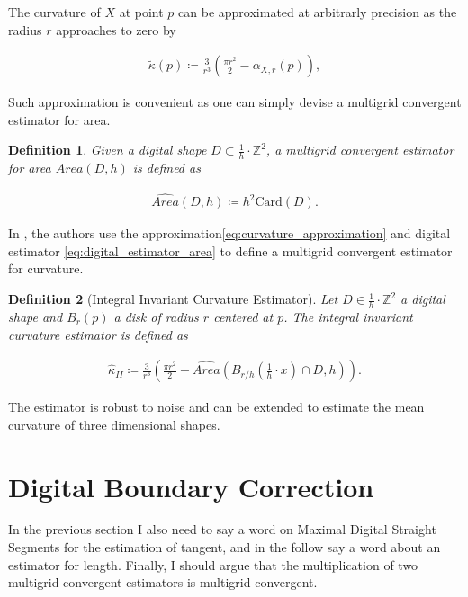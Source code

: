 \documentclass[runningheads]{llncs}
\newtheorem{ddef}{Definition}
\begin{document}
	The curvature of $X$ at point $p$ can be approximated at arbitrarly precision as the radius $r$ approaches to zero by
	
	\begin{align}
		\tilde{\kappa}(p) \coloneqq \frac{3}{r^3}\left( \frac{\pi r^2}{2} - \alpha_{X,r}(p) \right),
		\label{eq:curvature_approximation}
	\end{align}
	
	Such approximation is convenient as one can simply devise a multigrid convergent estimator for area.

	\begin{ddef}	
		Given a digital shape $D \subset \frac{1}{h} \cdot \mathbb{Z}^2$, a multigrid convergent estimator for area $\widehat{Area}(D,h)$ is defined as	
		
		\begin{align}
			\widehat{Area}(D,h) \coloneqq h^2\text{Card}\left( D \right).			
			\label{eq:digital_estimator_area}
		\end{align}

	\end{ddef}
	
	In \cite{coeurjolly13}, the authors use the approximation\eqref{eq:curvature_approximation} and digital estimator \eqref{eq:digital_estimator_area} to define a multigrid convergent estimator for curvature.

	\begin{ddef}[Integral Invariant Curvature Estimator]
		Let $D \in \frac{1}{h} \cdot \mathbb{Z}^2$ a digital shape and $B_r(p)$ a disk of radius $r$ centered at $p$. The integral invariant curvature estimator is defined as
		
		\begin{align*}
			\hat{\kappa}_{II} \coloneqq \frac{3}{r^3} \left( \frac{\pi r^2}{2} - \widehat{Area} \left( B_{r/h} ( \frac{1}{h} \cdot x ) \cap D, h \right) \right).
		\end{align*}
	\end{ddef}
	

	The estimator is robust to noise and can be extended to estimate the mean curvature of three dimensional shapes.

\section{Digital Boundary Correction}

In the previous section I also need to say a word on Maximal Digital Straight Segments for the estimation of tangent, and in the follow say a word about an estimator for length. Finally, I should argue that the multiplication of two multigrid convergent estimators is multigrid convergent.
\end{document}
